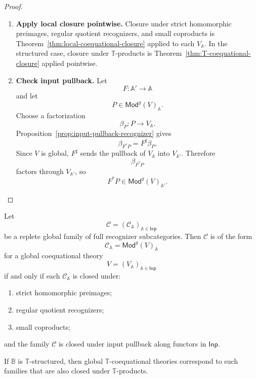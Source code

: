 \begin{proof}
    \leavevmode
    \begin{enumerate}
        \item \textbf{Apply local closure pointwise.}
        Closure under strict homomorphic preimages, regular quotient
        recognizers, and small coproducts is
        Theorem~\ref{thm:local-coequational-closure} applied to each
        \(V_{\mathbb A}\). In the structured case, closure under
        \(\mathbb T\)-products is Theorem~\ref{thm:T-coequational-closure}
        applied pointwise.

        \item \textbf{Check input pullback.}
        Let
        \[
            F:\mathbb A'\to\mathbb A
        \]
        and let
        \[
            P\in\mathsf{Mod}^{g}(V)_{\mathbb A}.
        \]
        Choose a factorization
        \[
            \beta_P:P\to V_{\mathbb A}.
        \]
        Proposition~\ref{prop:input-pullback-recognizer} gives
        \[
            \beta_{F^*P}=F^\sharp\beta_P.
        \]
        Since \(V\) is global, \(F^\sharp\) sends the pullback of
        \(V_{\mathbb A}\) into \(V_{\mathbb A'}\). Therefore
        \[
            \beta_{F^*P}
        \]
        factors through \(V_{\mathbb A'}\), so
        \[
            F^*P\in\mathsf{Mod}^{g}(V)_{\mathbb A'}.
        \]
    \end{enumerate}
\end{proof}

\begin{theorem}
\label{thm:global-coequational-birkhoff}
    Let
    \[
        \mathcal C=(\mathcal C_{\mathbb A})_{\mathbb A\in\mathsf{Inp}}
    \]
    be a replete global family of full recognizer subcategories. Then
    \(\mathcal C\) is of the form
    \[
        \mathcal C_{\mathbb A}
        =
        \mathsf{Mod}^{g}(V)_{\mathbb A}
    \]
    for a global coequational theory
    \[
        V=(V_{\mathbb A})_{\mathbb A\in\mathsf{Inp}}
    \]
    if and only if each \(\mathcal C_{\mathbb A}\) is closed under:
    \begin{enumerate}
        \item strict homomorphic preimages;
        \item regular quotient recognizers;
        \item small coproducts;
    \end{enumerate}
    and the family \(\mathcal C\) is closed under input pullback along functors
    in \(\mathsf{Inp}\).

    If \(\mathbb B\) is \(\mathbb T\)-structured, then global
    \(\mathbb T\)-coequational theories correspond to such families that are
    also closed under \(\mathbb T\)-products.
\end{theorem}

